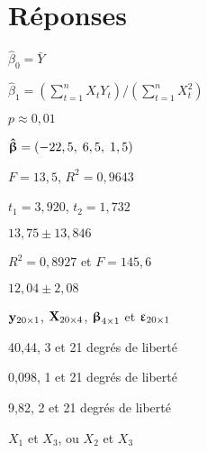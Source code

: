 \bigskip
\section*{Réponses}

\begin{reponse}{3.2}
    \begin{inparaenum}
      \item $\hat{\beta}_0 = \bar{Y}$
      \item $\hat{\beta}_1 = (\sum_{t=1}^n X_t Y_t)/(\sum_{t=1}^n X_t^2)$
      \end{inparaenum}
  
\end{reponse}
\begin{reponse}{3.6}
    $p \approx 0,01$
  
\end{reponse}
\begin{reponse}{3.7}
    \begin{inparaenum}
    \item $\boldsymbol{\hat{\upbeta}} = (-22,5,\; 6,5,\; 1,5)$
    \item $F = 13,5$, $R^2 = 0,9643$
    \item $t_1 = 3,920$, $t_2 = 1,732$
    \item $13,75 \pm 13,846$
    \end{inparaenum}
  
\end{reponse}
\begin{reponse}{3.8}
    \begin{inparaenum}
    \item $R^2 = 0,8927$ et
      $F = 145,6$
    \item $12,04 \pm
      2,08$
    \end{inparaenum}
  
\end{reponse}
\begin{reponse}{3.10}
    \begin{inparaenum}
    \item $\mathbf{y}_{20 \times 1}$, $\mathbf{X}_{20 \times 4}$, $\boldsymbol{\upbeta}_{4
        \times 1}$ et $\boldsymbol{\upvarepsilon}_{20 \times 1}$
    \end{inparaenum}
  
\end{reponse}
\begin{reponse}{3.11}
    \begin{inparaenum}
    \item
      \begin{inparaenum}[i)]
      \item 40,44, 3 et 21 degrés de liberté
      \item 0,098, 1 et 21 degrés de liberté
      \item 9,82, 2 et 21 degrés de liberté
      \end{inparaenum}
    \item $X_1$ et $X_3$, ou $X_2$ et $X_3$
    \end{inparaenum}
  
\end{reponse}
